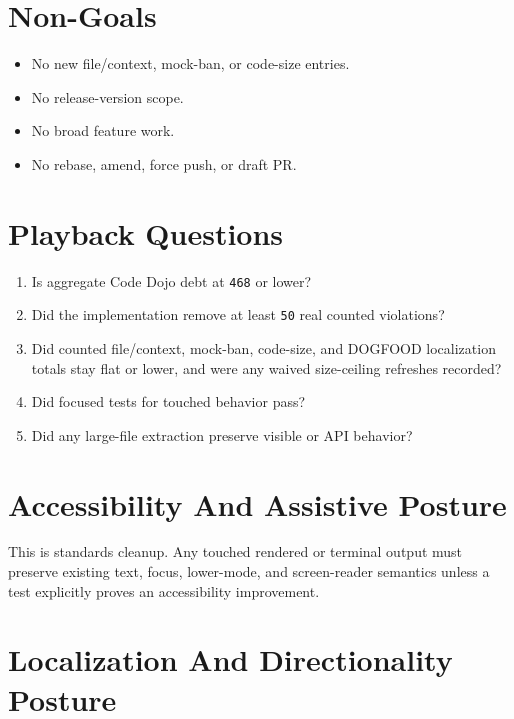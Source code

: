 \section{Non-Goals}\label{record-240-non-goals}

\begin{itemize}
\tightlist
\item
  No new file/context, mock-ban, or code-size entries.
\item
  No release-version scope.
\item
  No broad feature work.
\item
  No rebase, amend, force push, or draft PR.
\end{itemize}

\section{Playback Questions}\label{record-240-playback-questions}

\begin{enumerate}
\def\labelenumi{\arabic{enumi}.}
\tightlist
\item
  Is aggregate Code Dojo debt at \texttt{4\allowbreak{}6\allowbreak{}8} or lower?
\item
  Did the implementation remove at least \texttt{5\allowbreak{}0} real counted violations?
\item
  Did counted file/context, mock-ban, code-size, and DOGFOOD localization totals stay flat or lower, and were any waived size-ceiling refreshes recorded?
\item
  Did focused tests for touched behavior pass?
\item
  Did any large-file extraction preserve visible or API behavior?
\end{enumerate}

\section{Accessibility And Assistive Posture}\label{record-240-accessibility-and-assistive-posture}

This is standards cleanup. Any touched rendered or terminal output must preserve existing text, focus, lower-mode, and screen-reader semantics unless a test explicitly proves an accessibility improvement.

\section{Localization And Directionality Posture}\label{record-240-localization-and-directionality-posture}

